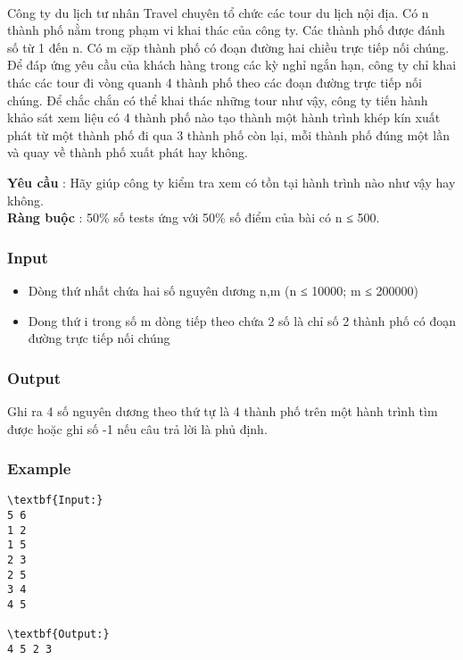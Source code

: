 

 

Công ty du lịch tư nhân Travel chuyên tổ chức các tour du lịch nội địa. Có n thành phố nằm trong phạm vi khai thác của công ty. Các thành phố được đánh số từ 1 đến n. Có m cặp thành phố có đoạn đường hai chiều trực tiếp nối chúng. Để đáp ứng yêu cầu của khách hàng trong các kỳ nghỉ ngắn hạn, công ty chỉ khai thác các tour đi vòng quanh 4 thành phố theo các đoạn đường trực tiếp nối chúng. Để chắc chắn có thể khai thác những tour như vậy, công ty tiến hành khảo sát xem liệu có 4 thành phố nào tạo thành một hành trình khép kín xuất phát từ một thành phố đi qua 3 thành phố còn lại, mỗi thành phố đúng một lần và quay về thành phố xuất phát hay không.

\textbf{Yêu cầu } : Hãy giúp công ty kiểm tra xem có tồn tại hành trình nào như vậy hay không.
\\\textbf{Ràng buộc } : 50\% số tests ứng với 50\% số điểm của bài có n ≤ 500.

\subsubsection{Input}
\begin{itemize}
	\item Dòng thứ nhất chứa hai số nguyên dương n,m (n ≤ 10000; m ≤ 200000)
	\item Dong thứ i trong số m dòng tiếp theo chứa 2 số là chỉ số 2 thành phố có đoạn đường trực tiếp nối chúng
\end{itemize}

\subsubsection{Output}

Ghi ra 4 số nguyên dương theo thứ tự là 4 thành phố trên một hành trình tìm được hoặc ghi số -1 nếu câu trả lời là phủ định.

\subsubsection{Example}
\begin{verbatim}
\textbf{Input:}
5 6
1 2
1 5
2 3
2 5
3 4
4 5

\textbf{Output:}
4 5 2 3
\end{verbatim}